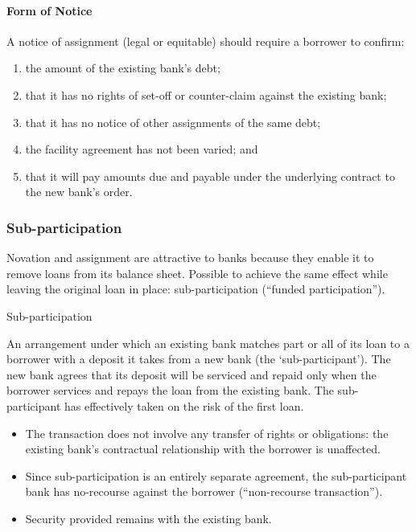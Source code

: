 \documentclass[
]{article}
\providecommand{\tightlist}{%
  \setlength{\itemsep}{0pt}\setlength{\parskip}{0pt}}
\newenvironment{env-f09e27d9-67b8-4931-ab1f-ca6031966775}
{
    \savenotes\tcolorbox[blanker,breakable,left=5pt,borderline west={2pt}{-4pt}{yellow}]
}
{
    \endtcolorbox\spewnotes
}
\begin{document}
\hypertarget{form-of-notice}{%
\paragraph{Form of Notice}\label{form-of-notice}}

A notice of assignment (legal or equitable) should require a borrower to
confirm:

\begin{enumerate}
\tightlist
\item
  the amount of the existing bank's debt;
\item
  that it has no rights of set-off or counter-claim against the existing
  bank;
\item
  that it has no notice of other assignments of the same debt;
\item
  the facility agreement has not been varied; and
\item
  that it will pay amounts due and payable under the underlying contract
  to the new bank's order.
\end{enumerate}

\hypertarget{sub-participation}{%
\subsubsection{Sub-participation}\label{sub-participation}}

Novation and assignment are attractive to banks because they enable it
to remove loans from its balance sheet. Possible to achieve the same
effect while leaving the original loan in place: sub-participation
(``funded participation'').

\begin{env-f09e27d9-67b8-4931-ab1f-ca6031966775}

Sub-participation

An arrangement under which an existing bank matches part or all of its
loan to a borrower with a deposit it takes from a new bank (the
`sub-participant'). The new bank agrees that its deposit will be
serviced and repaid only when the borrower services and repays the loan
from the existing bank. The sub-participant has effectively taken on the
risk of the first loan.

\end{env-f09e27d9-67b8-4931-ab1f-ca6031966775}

\begin{itemize}
\tightlist
\item
  The transaction does not involve any transfer of rights or
  obligations: the existing bank's contractual relationship with the
  borrower is unaffected.
\item
  Since sub-participation is an entirely separate agreement, the
  sub-participant bank has no-recourse against the borrower
  (``non-recourse transaction'').
\item
  Security provided remains with the existing bank.
\end{itemize}
\end{document}
